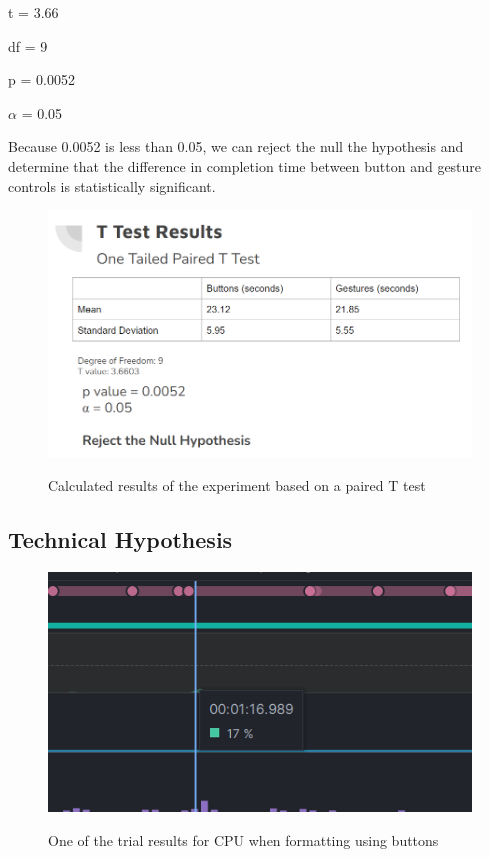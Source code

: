 \documentclass[conference]{IEEEtran}
\begin{document}
t = 3.66

df = 9

p = 0.0052

$\alpha$ = 0.05

Because 0.0052 is less than 0.05, we can reject the null the hypothesis and determine that the difference in completion time between button and gesture controls is statistically significant.

\begin{figure}[ht]
    \centering
    \includegraphics[scale=0.3]{images/results.png}\\
    \caption{Calculated results of the experiment based on a paired T test}
    \label{fig:enter-label}
\end{figure}

\subsection*{Technical Hypothesis}
\begin{figure}[ht]
    \centering
    \includegraphics[scale=0.4]{profilerresults/cpuusage_btn.jpg}\\
    \caption{One of the trial results for CPU when formatting using buttons}
    \label{fig:enter-label}
\end{figure}
\end{document}
